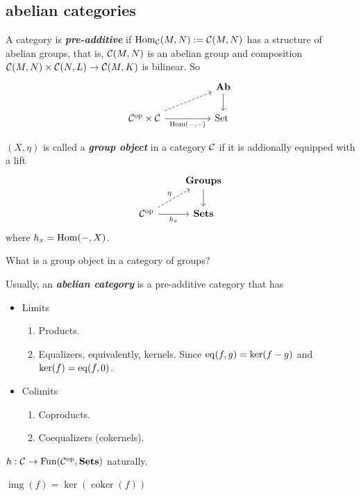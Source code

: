 \subsection{abelian categories}
\begin{defn}
	A category is \textbf{\textit{pre-additive}} if $\operatorname{Hom}_{\mathcal{C}}(M,N):=\mathcal{C}(M,N)$ has a structure of abelian groups, that is, $\mathcal{C}(M,N)$ is an abelian group and composition $\mathcal{C}(M,N)\times\mathcal{C}(N,L)\to\mathcal{C}(M,K)$ is bilinear. So
	\[\begin{tikzcd}[column sep=huge]
		&\Ab\arrow[d]\\
	\Cc^{\op}\times\Cc\arrow[r,"\Hom(-\text{,}-)",swap]\arrow[ur,dashed]&\Set
\	\end{tikzcd}\]
\end{defn}
\begin{defn}
	$(X,\eta)$ is called a \textbf{\textit{group object}} in a category $\mathcal{C}$ if it is addionally equipped with a lift
	\[\begin{tikzcd}
		&\Groups\arrow[d]\\		\Cc^{\op}\arrow[r,"h_x",swap]\arrow[ur,"\eta",dashed]&\Sets
	\end{tikzcd}\]
	where $h_x=\operatorname{Hom}(-,X)$.
\end{defn}
\begin{exercise}
	What is a group object in a category of groups?
\end{exercise}
\begin{defn}
	Usually, an \textbf{\textit{abelian category}} is a pre-additive category that has
	\begin{itemize}
		\item Limits
		\begin{enumerate}
			\item Products.
			\item Equalizers, equivalently, kernels. Since $\operatorname{eq}(f,g)=\ker(f-g)$ and $\ker(f)=\operatorname{eq}(f,0)$.
		\end{enumerate}
		\item Colimits
		\begin{enumerate}
			\item Coproducts.
			\item Coequalizers (cokernels).
		\end{enumerate}
	\end{itemize}
\end{defn}
\begin{lemma}[Yoneda]
	$h:\mathcal{C}\to\operatorname{Fun}(\mathcal{C}^{\operatorname{op}},\mathbf{Sets})$ naturally.
\end{lemma}
\begin{defn}
	$\operatorname{img}(f)=\ker(\operatorname{coker}(f))$
\end{defn}
